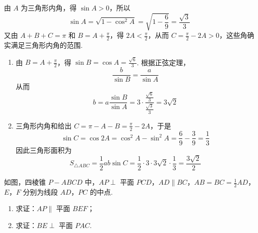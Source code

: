 \begin{solution}
由 \(A\) 为三角形内角，得 \(\sin A>0\)，所以
\[
\sin A=\sqrt{1-\cos^{2}A}=\sqrt{1-\frac{6}{9}}=\frac{\sqrt{3}}{3}
\]
又由 \(A+B+C=\pi\) 和 \(B=A+\frac\pi2\)，得 \(2A<\frac\pi2\)，从而 \(C=\frac\pi2-2A>0\)，这些角确实满足三角形内角的范围.

\begin{enumerate}
\item 由 \(B=A+\frac\pi2\)，得 \(\sin B=\cos A=\frac{\sqrt6}{3}\). 根据正弦定理，
\[
\frac{b}{\sin B}=\frac{a}{\sin A}
\]
从而
\[
b=a\frac{\sin B}{\sin A}=3\cdot\frac{\frac{\sqrt6}{3}}{\frac{\sqrt3}{3}}=3\sqrt2
\]

\item 三角形内角和给出 \(C=\pi-A-B=\frac\pi2-2A\)，于是
\[
\sin C=\cos 2A=\cos^{2}A-\sin^{2}A=\frac69-\frac39=\frac13
\]
因此三角形面积为
\[
S_{\triangle ABC}=\frac12ab\sin C=\frac12\cdot3\cdot3\sqrt2\cdot\frac13=\frac{3\sqrt2}{2}
\]
\end{enumerate}
\end{solution}

\begin{problem}
如图，四棱锥 \(P - ABCD\) 中，\(AP \perp\) 平面 \(PCD\)，\(AD \parallel BC\)，\(AB = BC = \frac{1}{2} AD\)，\(E\)，\(F\) 分别为线段 \(AD\)，\(PC\) 的中点.

\begin{enumerate}
\item 求证：\(AP \parallel\) 平面 \(BEF\)；
\item 求证：\(BE \perp\) 平面 \(PAC\).
\end{enumerate}

\end{problem}

